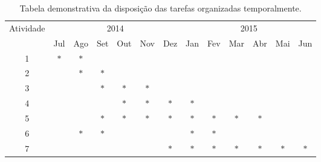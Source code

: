 \begin{table}[h]
    \begin{tabular}{|c|c|c|c|c|c|c|c|c|c|c|c|c|}
    \hline

    \multirow{2}{*}{Atividade} & \multicolumn{6}{c|}{2014} & \multicolumn{6}{c|}{2015} \\ \cline{2-13}
    ~ & Jul    & Ago    & Set    & Out    & Nov    & Dez    & Jan & Fev & Mar & Abr & Mai & Jun \\ \hline

    1 & $\ast$ & $\ast$ & ~      & ~      & ~      & ~      & ~      & ~      & ~      & ~      & ~      & ~      \\ \hline
    2 & ~      & $\ast$ & $\ast$ & ~      & ~      & ~      & ~      & ~      & ~      & ~      & ~      & ~      \\ \hline
    3 & ~      & ~      & $\ast$ & $\ast$ & $\ast$ & ~      & ~      & ~      & ~      & ~      & ~      & ~      \\ \hline
    4 & ~      & ~      & ~      & $\ast$ & $\ast$ & $\ast$ & $\ast$ & ~      & ~      & ~      & ~      & ~      \\ \hline
    5 & ~      & ~      & $\ast$ & $\ast$ & $\ast$ & $\ast$ & $\ast$ & $\ast$ & $\ast$ & $\ast$ & ~      & ~      \\ \hline
    6 & ~      & $\ast$ & $\ast$ & ~      & ~      & ~      & $\ast$ & $\ast$ & ~      & ~      & ~      & ~      \\ \hline
    7 & ~      & ~      & ~      & ~      & ~      & $\ast$ & $\ast$ & $\ast$ & $\ast$ & $\ast$ & $\ast$ & $\ast$ \\ \hline
    \end{tabular}
    \caption{Tabela demonstrativa da disposição das tarefas organizadas temporalmente.}
    \label{table:cronograma}
\end{table}



